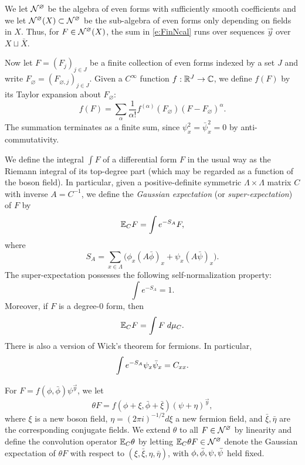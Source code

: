 We let $\mathcal{N}^\varnothing$ be the algebra of even forms with sufficiently smooth coefficients
and we let $\mathcal{N}^\varnothing(X) \subset \mathcal{N}^\varnothing$ be the sub-algebra of even forms only depending on fields
in $X$. Thus, for $F \in \mathcal{N}^\varnothing(X)$, the sum in \eqref{e:FinNcal} runs over sequences $\vec y$
over $X \sqcup \bar X$.

Now let $F = (F_j)_{j \in J}$ be a finite collection of even forms
indexed by a set $J$
and write $F_\varnothing = (F_{\varnothing,j})_{j \in J}$.
Given a $C^\infty$ function $f : {\mathbb R}^J \rightarrow \mathbb{C}$, we define
$f(F)$ by its Taylor expansion about $F_\varnothing$:
\begin{equation}
f(F) = \sum_\alpha \frac{1}{\alpha!} f^{(\alpha)}(F_\varnothing) (F - F_\varnothing)^\alpha.
\end{equation}
The summation terminates as a finite sum,
since $\psi_x^2 = \bar\psi_x^2 = 0$
by anti-commutativity.

We define the integral $\int F$ of a differential form $F$ in the usual way
as the Riemann integral of its top-degree part (which may be regarded as a function
of the boson field).
In particular, given a positive-definite symmetric
$\Lambda \times \Lambda$ matrix $C$ with inverse $A = C^{-1}$,
we define the \emph{Gaussian expectation} (or \emph{super-expectation}) of $F$ by
\begin{equation}
\lbeq{ExCF}
\Ex_C F = \int e^{-S_A} F,
\end{equation}
where
\begin{equation}
\label{e:action}
S_A = \sum_{x\in\Lambda} \Big(\phi_x (A\bar\phi)_x + \psi_x (A \bar\psi)_x\Big).
\end{equation}
The super-expectation possesses the following self-normalization property:
\begin{equation}
\label{e:self-normal}
\int e^{-S_A} = 1.
\end{equation}
Moreover, if $F$ is a degree-$0$ form, then
\begin{equation}
\mathbb{E}_C F = \int F \; d\mu_C.
\end{equation}
There is also a version of Wick's theorem for fermions. In particular,
\begin{equation}
\label{e:wick-fermion2}
\int e^{-S_A} \psi_x \bar\psi_x = C_{xx}.
\end{equation}

For $F = f(\phi, \bar\phi) \psi^{\vec y}$, we let
\begin{equation}
\theta F = f(\phi + \xi, \bar\phi + \bar\xi) (\psi + \eta)^{\vec y},
\end{equation}
where $\xi$ is a new boson field, $\eta = (2\pi i)^{-1/2} d\xi$ a new fermion field,
and $\bar\xi, \bar\eta$ are the corresponding conjugate fields.
We extend $\theta$ to all $F \in \mathcal{N}^\varnothing$ by linearity
and define the convolution operator $\mathbb{E}_C\theta$ by letting
$\mathbb{E}_C\theta F \in \mathcal{N}^\varnothing$ denote the Gaussian expectation of $\theta F$ with respect
to $(\xi, \bar\xi, \eta, \bar\eta)$, with $\phi,\bar\phi,\psi,\bar\psi$ held fixed.

